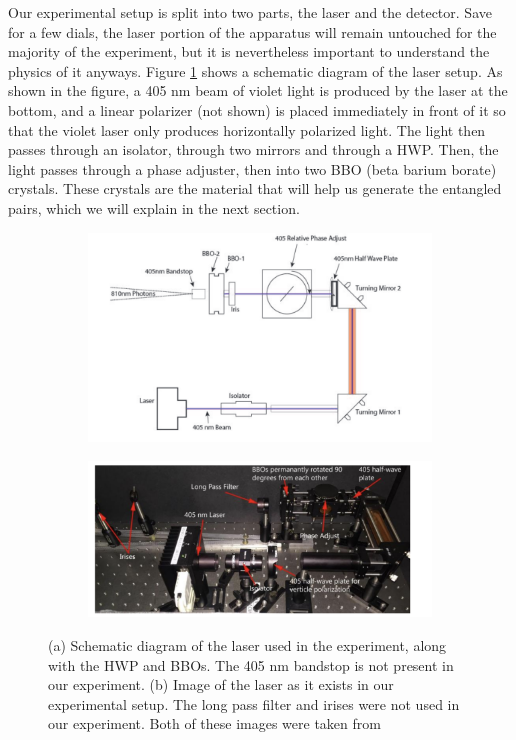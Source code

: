 \documentclass[10pt]{article}
\begin{document}
	Our experimental setup is split into two parts, the laser and the detector. Save for a few dials, the
	laser portion of the apparatus will remain untouched for the majority of the experiment, but it is
	nevertheless important to understand the physics of it anyways. Figure \ref{laser-block} shows a
	schematic diagram of the laser setup. As shown in the figure, a 405 nm beam of violet light is produced
	by the laser at the bottom, and a linear polarizer (not shown) is placed immediately in front of it so
	that the violet laser only produces horizontally polarized light. The light then passes through an
	isolator, through two mirrors and through a HWP. Then, the light passes through a phase
	adjuster, then into two BBO (beta barium borate) crystals. These crystals are the material that will help
	us generate the entangled pairs, which we will explain in the next section. 

	\begin{figure}
		\centering
		\begin{subfigure}{0.45\textwidth}			
			\includegraphics[scale=0.5]{images/laser-block.png}
			\caption{} 
			\label{laser-block}
		\end{subfigure}
		\begin{subfigure}{0.45\textwidth}
			\includegraphics[scale=0.5]{images/laser-photo.png}	
			\caption{}
			\label{laser-photo}
		\end{subfigure}
		\caption{(a) Schematic diagram of the laser used in the experiment, along with the HWP and BBOs. The 405
			nm bandstop is not present in our experiment. (b) Image of the laser as it exists in our
			experimental setup. The long pass filter and irises were not used in our experiment. Both of these
		images were taken from \cite{manual}}
	\end{figure}
\end{document}
